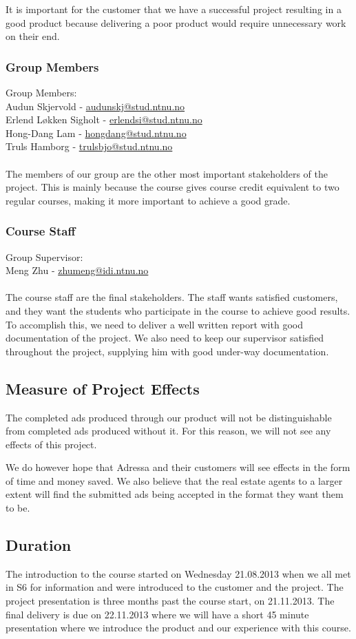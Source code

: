 It is important for the customer that we have a successful project resulting in a good product because delivering a poor product would require unnecessary work on their end.
\subsubsection{Group Members}
Group Members:\\
Audun Skjervold - \href{mailto://audunskj@stud.ntnu.no}{audunskj@stud.ntnu.no}\\
Erlend Løkken Sigholt - \href{mailto://erlendsi@stud.ntnu.no}{erlendsi@stud.ntnu.no}\\
Hong-Dang Lam - \href{mailto://hongdang@stud.ntnu.no}{hongdang@stud.ntnu.no}\\
Truls Hamborg - \href{mailto://trulsbjo@stud.ntnu.no}{trulsbjo@stud.ntnu.no}\\
\\
The members of our group are the other most important stakeholders of the project. This is mainly because the course gives course credit equivalent to two regular courses, making it more important to achieve a good grade.
\subsubsection{Course Staff}
Group Supervisor:\\
Meng Zhu - \href{mailto://zhumeng@idi.ntnu.no}{zhumeng@idi.ntnu.no}\\
\\
The course staff are the final stakeholders. The staff wants satisfied customers, and they want the students who participate in the course to achieve good results. To accomplish this, we need to deliver a well written report with good documentation of the project. We also need to keep our supervisor satisfied throughout the project, supplying him with good under-way documentation.

\subsection{Measure of Project Effects}
The completed ads produced through our product will not be distinguishable from completed ads produced without it. For this reason, we will not see any effects of this project.

We do however hope that Adressa and their customers will see effects in the form of time and money saved. We also believe that the real estate agents to a larger extent will find the submitted ads being accepted in the format they want them to be.

\subsection{Duration}
The introduction to the course started on Wednesday 21.08.2013 when we all met in S6 for information and were introduced to the customer and the project.
The project presentation is three months past the course start, on 21.11.2013.
The final delivery is due on 22.11.2013 where we will have a short 45 minute presentation where we introduce the product and our experience with this course.